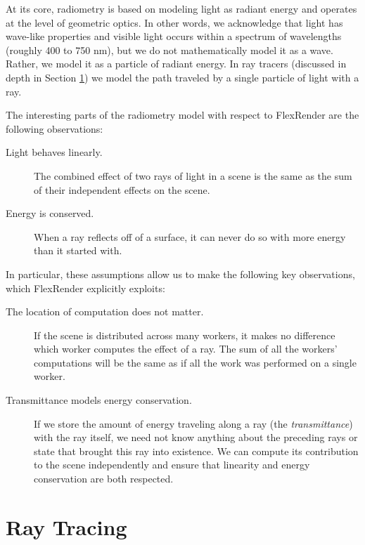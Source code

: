 \documentclass[12pt]{ucthesis}
\begin{document}
At its core, radiometry is based on modeling light as radiant energy and
operates at the level of geometric optics. In other words, we acknowledge that
light has wave-like properties and visible light occurs within a spectrum of
wavelengths (roughly 400 to 750 nm), but we do not mathematically model it as
a wave. Rather, we model it as a particle of radiant energy. In ray tracers
(discussed in depth in Section \ref{raytracing}) we model the path traveled by a single
particle of light with a ray.

The interesting parts of the radiometry model with respect to FlexRender are the
following observations:

\begin{description}
    \item[Light behaves linearly.] The combined effect of two rays of light
        in a scene is the same as the sum of their independent effects on the
        scene.
    \item[Energy is conserved.] When a ray reflects off of a surface, it can
        never do so with more energy than it started with.
\end{description}

In particular, these assumptions allow us to make the following key
observations, which FlexRender explicitly exploits:

\begin{description}
    \item[The location of computation does not matter.] If the scene is
        distributed across many workers, it makes no difference which worker
        computes the effect of a ray. The sum of all the workers' computations
        will be the same as if all the work was performed on a single worker.
    \item[Transmittance models energy conservation.] If we store the amount of
        energy traveling along a ray (the \emph{transmittance}) with the ray
        itself, we need not know anything about the preceding rays or state
        that brought this ray into existence. We can compute its contribution
        to the scene independently and ensure that linearity and energy
        conservation are both respected.
\end{description}

\section{Ray Tracing}
\label{raytracing}
\end{document}
